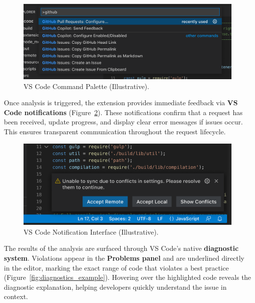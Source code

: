 \begin{spacing}{1.2}
\begin{figure}[H]
    \centering
    \includegraphics[scale=0.5]{Images/command_palette.png}
    \caption{VS Code Command Palette (Illustrative).}
    \label{fig:command_palette_example}
\end{figure}


Once analysis is triggered, the extension provides immediate feedback via \textbf{VS Code notifications} (Figure~\ref{fig:notification_example}). These notifications confirm that a request has been received, update progress, and display clear error messages if issues occur. This ensures transparent communication throughout the request lifecycle.

\begin{figure}[H]
    \centering
    \includegraphics[scale=0.8]{Images/vscode_notification.png}
    \caption{VS Code Notification Interface (Illustrative).}
    \label{fig:notification_example}
\end{figure}

The results of the analysis are surfaced through VS Code’s native \textbf{diagnostic system}. Violations appear in the \textbf{Problems panel} and are underlined directly in the editor, marking the exact range of code that violates a best practice (Figure~\ref{fig:diagnostics_example}). Hovering over the highlighted code reveals the diagnostic explanation, helping developers quickly understand the issue in context.


\end{spacing}
